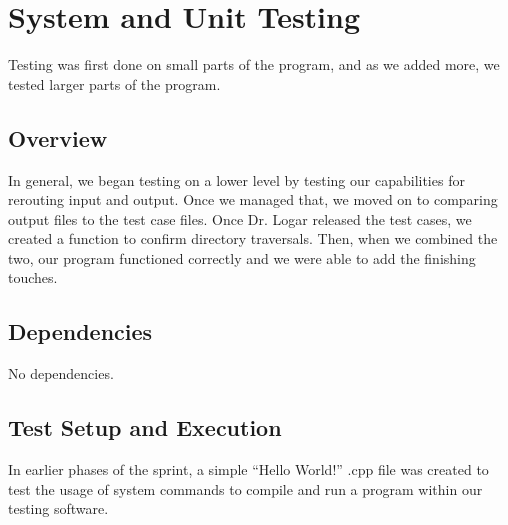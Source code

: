 
\chapter{System  and Unit Testing}

Testing was first done on small parts of the program, and as we added more, we tested larger parts of the program.

\section{Overview}
In general, we began testing on a lower level by testing our 
capabilities for rerouting input and output. Once we managed that,
we moved on to comparing output files to the test case files. Once Dr. 
Logar released the test cases, we created a function to confirm directory 
traversals. Then, when we combined the two, our program functioned correctly
and we were able to add the finishing touches.



\section{Dependencies}
No dependencies.


\section{Test Setup and Execution}
In earlier phases of the sprint, a simple “Hello World!” .cpp file was created to test the usage of system commands to compile and run a program within our testing software.

